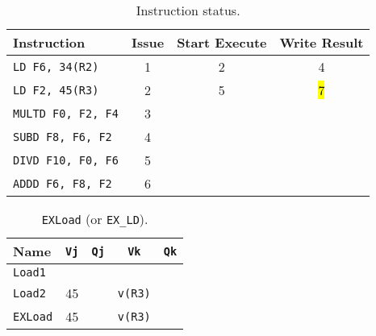 \begin{enumerate}
    \begin{table}[!htp]
        \centering
        \begin{tabular}{@{} l | c c c @{}}
            \toprule
            Instruction                 & Issue & Start Execute & Write Result  \\
            \midrule
            \texttt{LD    F6, 34(R2)}   & 1     & 2             & 4             \\ [.3em]
            \texttt{LD    F2, 45(R3)}   & 2     & 5             & \hl{7}        \\ [.3em]
            \texttt{MULTD F0, F2, F4}   & 3     &               &               \\ [.3em]
            \texttt{SUBD  F8, F6, F2}   & 4     &               &               \\ [.3em]
            \texttt{DIVD  F10, F0, F6}  & 5     &               &               \\ [.3em]
            \texttt{ADDD  F6, F8, F2}   & 6     &               &               \\
            \bottomrule
        \end{tabular}
        \caption*{Instruction status.}
    \end{table}

    \begin{table}[!htp]
        \centering
        \begin{tabular}{@{} l | c c c c @{}}
            \toprule
            Name            & \texttt{Vj}   & \texttt{Qj}   & \texttt{Vk}           & \texttt{Qk}   \\
            \midrule
            \texttt{Load1}  &               &               &                       &               \\ [.3em]
            \texttt{Load2}  & 45            &               & \texttt{v(R3)}        &               \\
            \cmidrule{1-5}
            \texttt{EXLoad} & 45            &               & \texttt{v(R3)}        &               \\
            \bottomrule
        \end{tabular}
        \caption*{\texttt{EXLoad} (or \texttt{EX\_LD}).}
    \end{table}


\end{enumerate}
